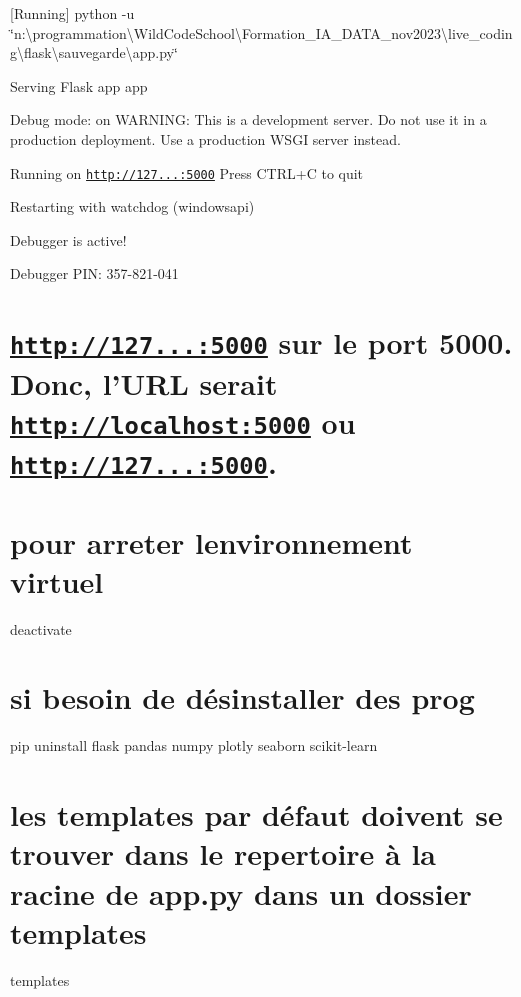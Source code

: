 \mbox{[}Running\mbox{]} python -\/u \char`\"{}n\+:\textbackslash{}programmation\textbackslash{}\+Wild\+Code\+School\textbackslash{}\+Formation\+\_\+\+I\+A\+\_\+\+D\+A\+T\+A\+\_\+nov2023\textbackslash{}live\+\_\+coding\textbackslash{}flask\textbackslash{}sauvegarde\textbackslash{}app.\+py\char`\"{}
\begin{DoxyItemize}
\item Serving Flask app \textquotesingle{}app\textquotesingle{}
\item Debug mode\+: on W\+A\+R\+N\+I\+NG\+: This is a development server. Do not use it in a production deployment. Use a production W\+S\+GI server instead.
\item Running on \href{http://127.0.0.1:5000}{\tt http\+://127...\+:5000} Press C\+T\+R\+L+C to quit
\item Restarting with watchdog (windowsapi)
\item Debugger is active!
\item Debugger P\+IN\+: 357-\/821-\/041
\item \section*{\href{http://127.0.0.1:5000}{\tt http\+://127...\+:5000} sur le port 5000. Donc, l’\+U\+RL serait \href{http://localhost:5000}{\tt http\+://localhost\+:5000} ou \href{http://127.0.0.1:5000}{\tt http\+://127...\+:5000}.}
\end{DoxyItemize}

\section*{pour arreter l\textquotesingle{}environnement virtuel}

deactivate

\section*{si besoin de désinstaller des prog}

pip uninstall flask pandas numpy plotly seaborn scikit-\/learn

\section*{les templates par défaut doivent se trouver dans le repertoire à la racine de app.\+py dans un dossier templates}

templates 